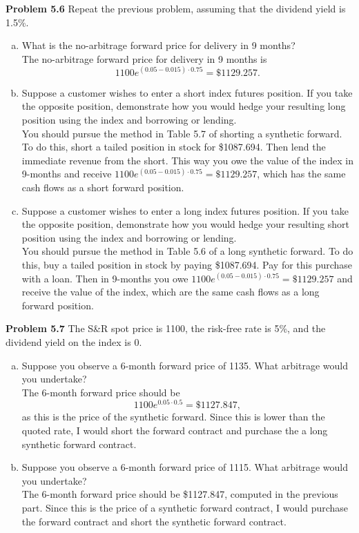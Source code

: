 \documentclass[12pt]{article}
\newcommand{\problem}[1]{\bigskip \noindent \textbf{Problem #1}}
\theoremstyle{plain}
\begin{document}
\problem{5.6} Repeat the previous problem, assuming that the dividend yield is 1.5\%.
\begin{enumerate}[(a)]
\item What is the no-arbitrage forward price for delivery in 9 months?\\

The no-arbitrage forward price for delivery in 9 months is
\[
1100 e^{(0.05-0.015)\cdot 0.75} = \$1129.257.
\]

\item Suppose a customer wishes to enter a short index futures position. If you take the opposite position, demonstrate how you would hedge your resulting long position using the index and borrowing or lending.\\

You should pursue the method in Table 5.7 of shorting a synthetic forward. To do this, short a tailed position in stock for \$1087.694. Then lend the immediate revenue from the short. This way you owe the value of the index in 9-months and receive $1100e^{(0.05-0.015)\cdot 0.75} = \$1129.257$, which has the same cash flows as a short forward position.

\item Suppose a customer wishes to enter a long index futures position. If you take the opposite position, demonstrate how you would hedge your resulting short position using the index and borrowing or lending.\\

You should pursue the method in Table 5.6 of a long synthetic forward. To do this, buy a tailed position in stock by paying \$1087.694. Pay for this purchase with a loan. Then in 9-months you owe $1100 e^{(0.05-0.015) \cdot 0.75} = \$1129.257$ and receive the value of the index, which are the same cash flows as a long forward position.
\end{enumerate}

\problem{5.7} The S\&R spot price is 1100, the risk-free rate is 5\%, and the dividend yield on the index is 0.
\begin{enumerate}[(a)]
\item Suppose you observe a 6-month forward price of 1135. What arbitrage would you undertake?\\

The 6-month forward price should be
\[
1100 e^{0.05\cdot 0.5} = \$1127.847,
\]
as this is the price of the synthetic forward. Since this is lower than the quoted rate, I would short the forward contract and purchase the a long synthetic forward contract.

\item Suppose you observe a 6-month forward price of 1115. What arbitrage would you undertake?\\

The 6-month forward price should be \$1127.847, computed in the previous part. Since this is the price of a synthetic forward contract, I would purchase the forward contract and short the synthetic forward contract.

\end{enumerate}
\end{document}
